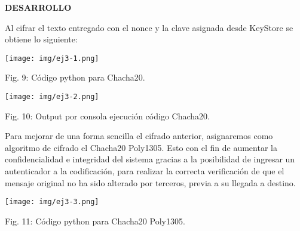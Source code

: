\documentclass[12pt,oneside,a4paper]{book}
\begin{document}
\vspace{2em}

\hspace{20pt} \textbf{DESARROLLO}

\vspace{1em}

\hspace{20pt}
Al cifrar el texto entregado con el nonce y la clave asignada desde KeyStore se obtiene lo siguiente:

\vspace{2em}

\begin{center}
    \texttt{[image: img/ej3-1.png]}
    
\vspace{0.1em}
    
    Fig. 9: Código python para Chacha20.
\end{center}

\vspace{2em}

\begin{center}
    \texttt{[image: img/ej3-2.png]}
    
\vspace{0.1em}
    
    Fig. 10: Output por consola ejecución código Chacha20.
\end{center}

\vspace{2em}

\hspace{20pt}
Para mejorar de una forma sencilla el cifrado anterior, asignaremos como algoritmo de cifrado el Chacha20 Poly1305. Esto con el fin de aumentar la confidencialidad e integridad del sistema gracias a la posibilidad de ingresar un autenticador a la codificación, para realizar la correcta verificación de que el mensaje original no ha sido alterado por terceros, previa a su llegada a destino.

\vspace{2em}

\begin{center}
    \texttt{[image: img/ej3-3.png]}
    
\vspace{0.1em}
    
    Fig. 11: Código python para Chacha20 Poly1305.
\end{center}

\vspace{2em}
\end{document}
